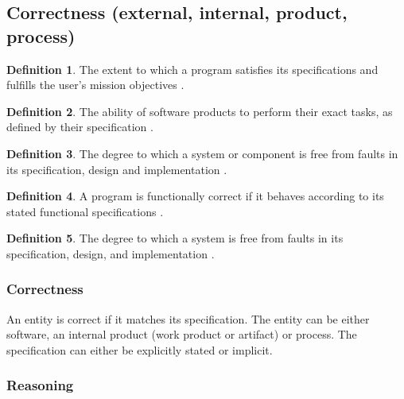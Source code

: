 \documentclass[letterpaper, cleveref]{lipics-v2019}
\newcommand{\authornote}[3]{\textcolor{#1}{[#3 ---#2]}}
\newcommand{\authornote}[3]{}
\newcommand{\oo}[1]{\authornote{magenta}{OO}{#1}} %
\theoremstyle{definition}
\newtheorem{defn}{Definition}
\begin{document}

 \subsection{Correctness (external, internal, product, process)} %

\begin{defn} \label{Correctness_McCallEtAl1977}
  The extent to which a program satisfies its specifications and fulfills the
  user's mission objectives \citep{McCallEtAl1977}. 
\end{defn}

\begin{defn} \label{Correctness_meyer1988object}
  The ability of software products to perform their exact tasks, as defined by
  their specification \citep{meyer1988object}.
\end{defn}

\begin{defn} \label{Correctness_IEEEComputerDictionary1991}
  The degree to which a system or component is free from faults in its
  specification, design and implementation \citep{IEEEComputerDictionary1991}.
\end{defn}

\begin{defn} \label{Correctness_GhezziEtAl2003}
  A program is functionally correct if it behaves according to its stated
  functional specifications \citep{GhezziEtAl2003}.  	
\end{defn}

\begin{defn} \label{Correctness_mcconnell2004code}
  The degree to which a system is free from faults in its specification, design,
  and implementation \citep{mcconnell2004code}.
\end{defn}

\begin{mybox}
\subsubsection*{Correctness}
An entity is correct if it matches its specification.  The entity can be either
software, an internal product (work product or artifact) or process.  The
specification can either be explicitly stated or implicit.
\end{mybox}

\subsubsection*{Reasoning}
\end{document}
